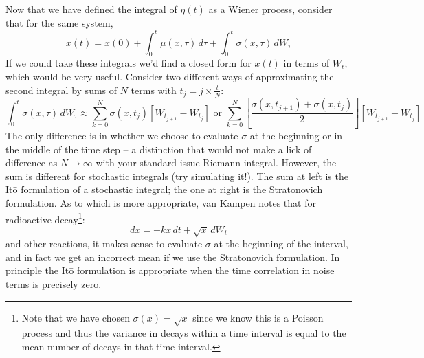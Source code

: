 \documentclass{article}
\begin{document}
Now that we have defined the integral of $\eta(t)$ as a Wiener process, consider that for the same system,
\[ x(t) = x(0) + \int_0^t \mu(x,\tau) \, d\tau + \int_0^t \sigma(x,\tau) \, dW_{\tau} \]
If we could take these integrals we'd find a closed form for $x(t)$ in terms of $W_t$, which would be very useful. Consider two different ways of approximating the second integral by sums of $N$ terms with $t_j = j \times \frac{t}{N}$:
\[ \int_0^t \sigma(x,\tau) \, dW_{\tau} \approx \sum_{k=0}^N \sigma(x,t_{j}) \left[ W_{t_{j+1}} - W_{t_j} \right] \textrm{ or } \sum_{k=0}^N \left[ \frac{\sigma(x,t_{j+1}) + \sigma(x,t_{j})}{2} \right] \left[ W_{t_{j+1}} - W_{t_j} \right] \]
The only difference is in whether we choose to evaluate $\sigma$ at the beginning or in the middle of the time step -- a distinction that would not make a lick of difference as $N \to \infty$ with your standard-issue Riemann integral. However, the sum is different for stochastic integrals (try simulating it!). The sum at left is the It\={o} formulation of a stochastic integral; the one at right is the Stratonovich formulation. As to which is more appropriate, van Kampen notes that for radioactive decay\footnote{Note that we have chosen $\sigma(x)=\sqrt{x}$ since we know this is a Poisson process and thus the variance in decays within a time interval is equal to the mean number of decays in that time interval.}:
\[ dx = - k x \, dt + \sqrt{x} \, dW_t \]
and other reactions, it makes sense to evaluate $\sigma$ at the beginning of the interval, and in fact we get an incorrect mean if we use the Stratonovich formulation. In principle the It\={o} formulation is appropriate when the time correlation in noise terms is precisely zero.\\
\end{document}
